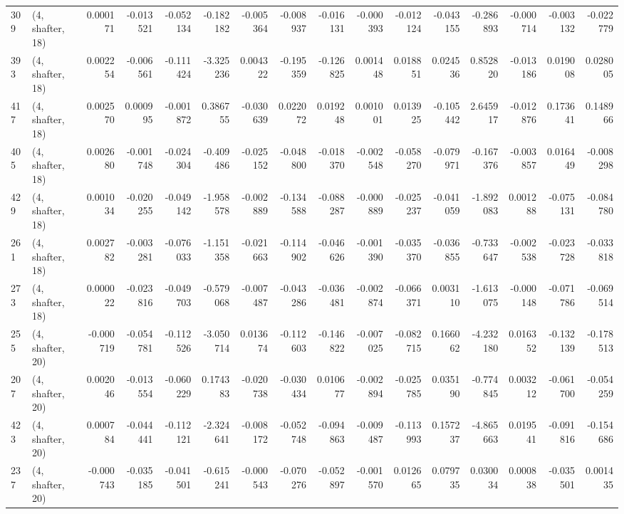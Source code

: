 \begin{tabular}{llrrrrrrrrrrrrrr}
309 &  (4, shafter, 18) &   0.000171 & -0.013521 & -0.052134 &    -0.182182 &  -0.005364 &  -0.008937 &  -0.016131 & -0.000393 & -0.012124 & -0.043155 &   -0.286893 & -0.000714 & -0.003132 & -0.022779 \\
393 &  (4, shafter, 18) &   0.002254 & -0.006561 & -0.111424 &    -3.325236 &   0.004322 &  -0.195359 &  -0.126825 &  0.001448 &  0.018851 &  0.024536 &    0.852820 & -0.013186 &  0.019008 &  0.028005 \\
417 &  (4, shafter, 18) &   0.002570 &  0.000995 & -0.001872 &     0.386755 &  -0.030639 &   0.022072 &   0.019248 &  0.001001 &  0.013925 & -0.105442 &    2.645917 & -0.012876 &  0.173641 &  0.148966 \\
405 &  (4, shafter, 18) &   0.002680 & -0.001748 & -0.024304 &    -0.409486 &  -0.025152 &  -0.048800 &  -0.018370 & -0.002548 & -0.058270 & -0.079971 &   -0.167376 & -0.003857 &  0.016449 & -0.008298 \\
429 &  (4, shafter, 18) &   0.001034 & -0.020255 & -0.049142 &    -1.958578 &  -0.002889 &  -0.134588 &  -0.088287 & -0.000889 & -0.025237 & -0.041059 &   -1.892083 &  0.001288 & -0.075131 & -0.084780 \\
261 &  (4, shafter, 18) &   0.002782 & -0.003281 & -0.076033 &    -1.151358 &  -0.021663 &  -0.114902 &  -0.046626 & -0.001390 & -0.035370 & -0.036855 &   -0.733647 & -0.002538 & -0.023728 & -0.033818 \\
273 &  (4, shafter, 18) &   0.000022 & -0.023816 & -0.049703 &    -0.579068 &  -0.007487 &  -0.043286 &  -0.036481 & -0.002874 & -0.066371 &  0.003110 &   -1.613075 & -0.000148 & -0.071786 & -0.069514 \\
255 &  (4, shafter, 20) &  -0.000719 & -0.054781 & -0.112526 &    -3.050714 &   0.013674 &  -0.112603 &  -0.146822 & -0.007025 & -0.082715 &  0.166062 &   -4.232180 &  0.016352 & -0.132139 & -0.178513 \\
207 &  (4, shafter, 20) &   0.002046 & -0.013554 & -0.060229 &     0.174383 &  -0.020738 &  -0.030434 &   0.010677 & -0.002894 & -0.025785 &  0.035190 &   -0.774845 &  0.003212 & -0.061700 & -0.054259 \\
423 &  (4, shafter, 20) &   0.000784 & -0.044441 & -0.112121 &    -2.324641 &  -0.008172 &  -0.052748 &  -0.094863 & -0.009487 & -0.113993 &  0.157237 &   -4.865663 &  0.019541 & -0.091816 & -0.154686 \\
237 &  (4, shafter, 20) &  -0.000743 & -0.035185 & -0.041501 &    -0.615241 &  -0.000543 &  -0.070276 &  -0.052897 & -0.001570 &  0.012665 &  0.079735 &    0.030034 &  0.000838 & -0.035501 &  0.001435 \\

\end{tabular}

